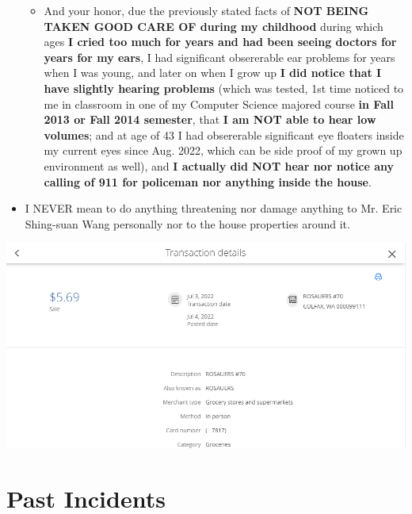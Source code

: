 \documentclass[9pt, b5paper]{article}
\begin{document}
\begin{itemize}
\begin{itemize}
\item And your honor, due the previously stated facts of \textbf{NOT BEING TAKEN GOOD CARE OF during my childhood} during which ages \textbf{I cried too much for years and had been seeing doctors for years for my ears}, I had significant obsererable ear problems for years when I was young, and later on when I grow up \textbf{I did notice that I have slightly hearing problems} (which was tested, 1st time noticed to me in classroom in one of my Computer Science majored course \textbf{in Fall 2013 or Fall 2014 semester}, that \textbf{I am NOT able to hear low volumes}; and at age of 43 I had obsererable significant eye floaters inside my current eyes since Aug. 2022, which can be side proof of my grown up environment as well), and \textbf{I actually did NOT hear nor notice any calling of 911 for policeman nor anything inside the house}.
\end{itemize}
\item I NEVER mean to do anything threatening nor damage anything to Mr. Eric Shing-suan Wang personally nor to the house properties around it.
\end{itemize}

\includegraphics[width=.9\linewidth]{./pic/dearCousin_20220919_201117.png}
\section{Past Incidents}
\label{sec-5}
\end{document}
